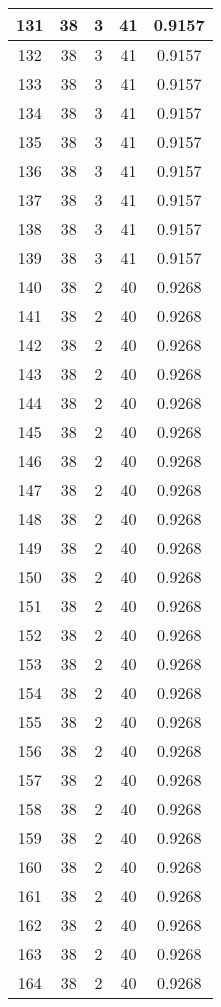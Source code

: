 \documentclass[letterpaper, 12pt]{article}
\begin{document}
\begin{longtable}{|c|c|c|c|c|}
\hline
131 & 38 & 3 & 41 & 0.9157 \\
\hline
132 & 38 & 3 & 41 & 0.9157 \\
\hline
133 & 38 & 3 & 41 & 0.9157 \\
\hline
134 & 38 & 3 & 41 & 0.9157 \\
\hline
135 & 38 & 3 & 41 & 0.9157 \\
\hline
136 & 38 & 3 & 41 & 0.9157 \\
\hline
137 & 38 & 3 & 41 & 0.9157 \\
\hline
138 & 38 & 3 & 41 & 0.9157 \\
\hline
139 & 38 & 3 & 41 & 0.9157 \\
\hline
140 & 38 & 2 & 40 & 0.9268 \\
\hline
141 & 38 & 2 & 40 & 0.9268 \\
\hline
142 & 38 & 2 & 40 & 0.9268 \\
\hline
143 & 38 & 2 & 40 & 0.9268 \\
\hline
144 & 38 & 2 & 40 & 0.9268 \\
\hline
145 & 38 & 2 & 40 & 0.9268 \\
\hline
146 & 38 & 2 & 40 & 0.9268 \\
\hline
147 & 38 & 2 & 40 & 0.9268 \\
\hline
148 & 38 & 2 & 40 & 0.9268 \\
\hline
149 & 38 & 2 & 40 & 0.9268 \\
\hline
150 & 38 & 2 & 40 & 0.9268 \\
\hline
151 & 38 & 2 & 40 & 0.9268 \\
\hline
152 & 38 & 2 & 40 & 0.9268 \\
\hline
153 & 38 & 2 & 40 & 0.9268 \\
\hline
154 & 38 & 2 & 40 & 0.9268 \\
\hline
155 & 38 & 2 & 40 & 0.9268 \\
\hline
156 & 38 & 2 & 40 & 0.9268 \\
\hline
157 & 38 & 2 & 40 & 0.9268 \\
\hline
158 & 38 & 2 & 40 & 0.9268 \\
\hline
159 & 38 & 2 & 40 & 0.9268 \\
\hline
160 & 38 & 2 & 40 & 0.9268 \\
\hline
161 & 38 & 2 & 40 & 0.9268 \\
\hline
162 & 38 & 2 & 40 & 0.9268 \\
\hline
163 & 38 & 2 & 40 & 0.9268 \\
\hline
164 & 38 & 2 & 40 & 0.9268 \\

\end{longtable}
\end{document}
